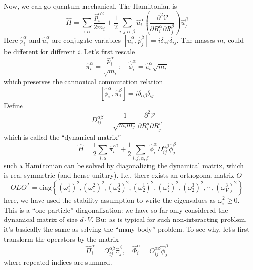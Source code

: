 Now, we can go quantum mechanical. The Hamiltonian is
\[ \hat{H}=\sum_{i,\alpha}{\frac{\hat{p}_{i}^{\alpha 2}}{2m_i}}+\frac{1}{2}\sum_{i,j,\alpha ,\beta}{\hat{u}_{i}^{\alpha}\left( \frac{\partial ^2\mathcal{V}}{\partial R_{i}^{\alpha}\partial R_{j}^{\beta}} \right) \hat{u}_{j}^{\beta}}\]
Here $\hat{p}_i^\alpha$ and $\hat{u}_i^\alpha$ are conjugate variables $\left[ \hat{u}_{i}^{\alpha},\hat{p}_{j}^{\beta} \right] =i\delta _{\alpha \beta}\delta _{ij}$. The masses $m_i$ could be different for different $i$. Let's first rescale
\[ \hat{\pi}_{i}^{\alpha}=\frac{\hat{p}_{i}^{\alpha}}{\sqrt{m_i}};\quad \hat{\phi}_{i}^{\alpha}=\hat{u}_{i}^{\alpha}\sqrt{m_i} \]
which preserves the cannonical commutation relation
\[ \left[ \hat{\phi}_{i}^{\alpha},\hat{\pi}_{j}^{\beta} \right] =i\delta _{\alpha \beta}\delta _{ij}\]
Define
\[ D_{ij}^{\alpha \beta}=\frac{1}{\sqrt{m_im_j}}\frac{\partial ^2\mathcal{V}}{\partial R_{i}^{\alpha}\partial R_{j}^{\beta}}\]
which is called the ``dynamical matrix''
\[ \hat{H}=\frac{1}{2}\sum_{i,\alpha}{\hat{\pi}_{i}^{\alpha 2}}+\frac{1}{2}\sum_{i,j,\alpha ,\beta}{\hat{\phi}_{i}^{\alpha}D_{ij}^{\alpha \beta}\hat{\phi}_{j}^{\beta}}\]
such a Hamiltonian can be solved by diagonalizing the dynamical matrix, which is real symmetric (and hense unitary). I.e., there exists an orthogonal matrix $O$
\[ ODO^T=\mathrm{diag}\left\{ \left( \omega _{1}^{1} \right) ^2,\left( \omega _{1}^{2} \right) ^2,\left( \omega _{2}^{3} \right) ^2,\left( \omega _{2}^{1} \right) ^2,\left( \omega _{2}^{2} \right) ^2,\left( \omega _{2}^{3} \right) ^2,\cdots ,\left( \omega _{V}^{3} \right) ^2 \right\} \]
here, we have used the stability assumption to write the eigenvalues as $\omega_i^2\geq 0$. This is a ``one-particle'' diagonalization: we have so far only considered the dynamical matrix of size $d\cdot V$. But as is typical for such non-interacting problem, it's basically the same as solving the ``many-body'' problem. To see why, let's first transform the operators by the matrix
\[ \hat{\Pi}_{i}^{\alpha}=O_{ij}^{\alpha \beta}\hat{\pi}_{j}^{\beta},\quad \hat{\Phi}_{i}^{\alpha}=O_{ij}^{\alpha \beta}\hat{\phi}_{j}^{\beta}\]
where repeated indices are summed.

